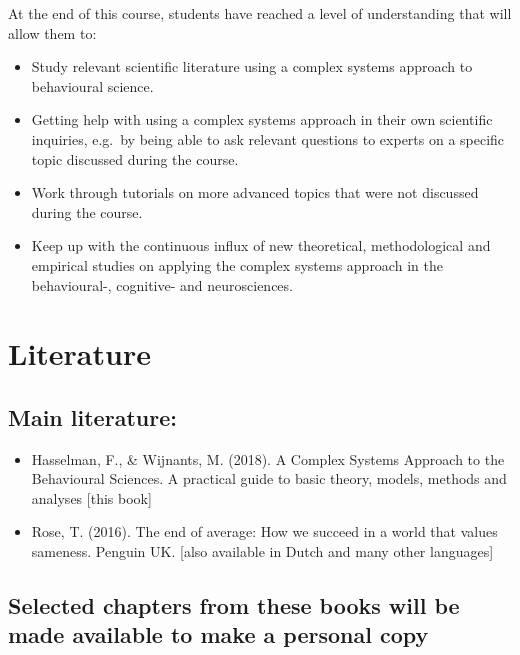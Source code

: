 \documentclass[12pt,]{book}
\providecommand{\tightlist}{%
  \setlength{\itemsep}{0pt}\setlength{\parskip}{0pt}}
\let\stdsection\section
\renewcommand\section{\newpage\stdsection}
\begin{document}
At the end of this course, students have reached a level of understanding that will allow them to:

\begin{itemize}
\tightlist
\item
  Study relevant scientific literature using a complex systems approach to behavioural science.
\item
  Getting help with using a complex systems approach in their own scientific inquiries, e.g.~by being able to ask relevant questions to experts on a specific topic discussed during the course.
\item
  Work through tutorials on more advanced topics that were not discussed during the course.
\item
  Keep up with the continuous influx of new theoretical, methodological and empirical studies on applying the complex systems approach in the behavioural-, cognitive- and neurosciences.
\end{itemize}

\hypertarget{literature}{%
\section*{\texorpdfstring{\textbf{Literature}}{Literature}}\label{literature}}

\hypertarget{main-literature}{%
\subsection*{Main literature:}\label{main-literature}}

\begin{itemize}
\tightlist
\item
  Hasselman, F., \& Wijnants, M. (2018). A Complex Systems Approach to the Behavioural Sciences. A practical guide to basic theory, models, methods and analyses {[}this book{]}
\item
  Rose, T. (2016). The end of average: How we succeed in a world that values sameness. Penguin UK. {[}also available in Dutch and many other languages{]}
\end{itemize}

\hypertarget{selected-chapters-from-these-books-will-be-made-available-to-make-a-personal-copy}{%
\subsection*{Selected chapters from these books will be made available to make a personal copy}\label{selected-chapters-from-these-books-will-be-made-available-to-make-a-personal-copy}}
\end{document}
